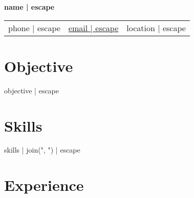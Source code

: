 \documentclass[9pt, a4paper]{article} %
\newcommand{\resumename}[1]{\centering\Large\bfseries #1\par\vspace{0.2em}}
\newcommand{\contactinfo}[3]{%
    \centering
    \begin{tabularx}{0.95\textwidth}{c X c}
        #1 & \href{mailto:#3}{#3} & #2
    \end{tabularx}
\AtBeginDocument{%
  \fontsize{9}{9.5}\selectfont
}
}
\begin{document}
\resumename{ {{ name | escape }} }
\contactinfo{ {{ phone | escape }} }{ {{ location | escape }} }{ {{ email | escape }} }

\section*{Objective}
{{ objective | escape }}

\section*{Skills}
\noindent
{{ skills | join(", ") | escape }}

\section*{Experience}
\end{document}

